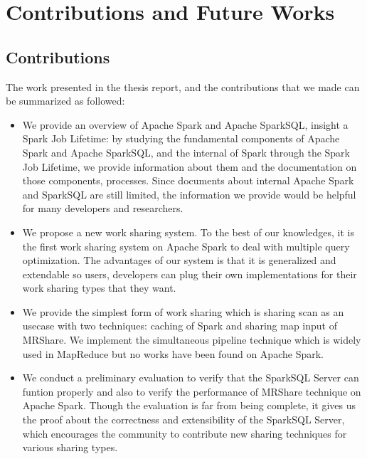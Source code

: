 
\chapter{Contributions and Future Works} %

\label{Chapter6} %



\section{Contributions}
The work presented in the thesis report, and the contributions that we made can be summarized as followed:
\begin{itemize}
\item We provide an overview of Apache Spark and Apache SparkSQL, insight a Spark Job Lifetime: 
by studying the fundamental components of Apache Spark and Apache SparkSQL, and the internal of Spark through the Spark Job Lifetime, we provide information about them and the documentation on those components, processes. Since documents about internal Apache Spark and SparkSQL are still limited, the information we provide would be helpful for many developers and researchers.

\item We propose a new work sharing system. To the best of our knowledges, it is the first work sharing system on Apache Spark to deal with multiple query optimization. The advantages of our system is that it is generalized and extendable so users, developers can plug their own implementations for their  work sharing types that they want. 

\item We provide the simplest form of work sharing which is sharing scan as an usecase with two techniques: caching of Spark and sharing map input of MRShare. We implement the simultaneous pipeline technique which is widely used in MapReduce but no works have been found on Apache Spark.

\item We conduct a preliminary evaluation to verify that the SparkSQL Server can funtion properly and also to verify the performance of MRShare technique on Apache Spark. Though the evaluation is far from being complete, it gives us the proof about the correctness and extensibility of the SparkSQL Server, which encourages the community to contribute new sharing techniques for various sharing types.
\end{itemize}

